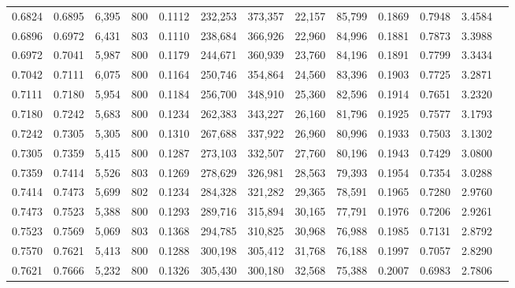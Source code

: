 \begin{tabular}{rrrrrrrrrrrrr}
0.6824 & 0.6895 &  6,395 & 800 &                                     0.1112 & 232,253 & 373,357 &  22,157 &  85,799 & 0.1869 & 0.7948 & 3.4584 \\
0.6896 & 0.6972 &  6,431 & 803 &                                     0.1110 & 238,684 & 366,926 &  22,960 &  84,996 & 0.1881 & 0.7873 & 3.3988 \\
0.6972 & 0.7041 &  5,987 & 800 &                                     0.1179 & 244,671 & 360,939 &  23,760 &  84,196 & 0.1891 & 0.7799 & 3.3434 \\
0.7042 & 0.7111 &  6,075 & 800 &                                     0.1164 & 250,746 & 354,864 &  24,560 &  83,396 & 0.1903 & 0.7725 & 3.2871 \\
0.7111 & 0.7180 &  5,954 & 800 &                                     0.1184 & 256,700 & 348,910 &  25,360 &  82,596 & 0.1914 & 0.7651 & 3.2320 \\
0.7180 & 0.7242 &  5,683 & 800 &                                     0.1234 & 262,383 & 343,227 &  26,160 &  81,796 & 0.1925 & 0.7577 & 3.1793 \\
0.7242 & 0.7305 &  5,305 & 800 &                                     0.1310 & 267,688 & 337,922 &  26,960 &  80,996 & 0.1933 & 0.7503 & 3.1302 \\
0.7305 & 0.7359 &  5,415 & 800 &                                     0.1287 & 273,103 & 332,507 &  27,760 &  80,196 & 0.1943 & 0.7429 & 3.0800 \\
0.7359 & 0.7414 &  5,526 & 803 &                                     0.1269 & 278,629 & 326,981 &  28,563 &  79,393 & 0.1954 & 0.7354 & 3.0288 \\
0.7414 & 0.7473 &  5,699 & 802 &                                     0.1234 & 284,328 & 321,282 &  29,365 &  78,591 & 0.1965 & 0.7280 & 2.9760 \\
0.7473 & 0.7523 &  5,388 & 800 &                                     0.1293 & 289,716 & 315,894 &  30,165 &  77,791 & 0.1976 & 0.7206 & 2.9261 \\
0.7523 & 0.7569 &  5,069 & 803 &                                     0.1368 & 294,785 & 310,825 &  30,968 &  76,988 & 0.1985 & 0.7131 & 2.8792 \\
0.7570 & 0.7621 &  5,413 & 800 &                                     0.1288 & 300,198 & 305,412 &  31,768 &  76,188 & 0.1997 & 0.7057 & 2.8290 \\
0.7621 & 0.7666 &  5,232 & 800 &                                     0.1326 & 305,430 & 300,180 &  32,568 &  75,388 & 0.2007 & 0.6983 & 2.7806 \\

\end{tabular}
